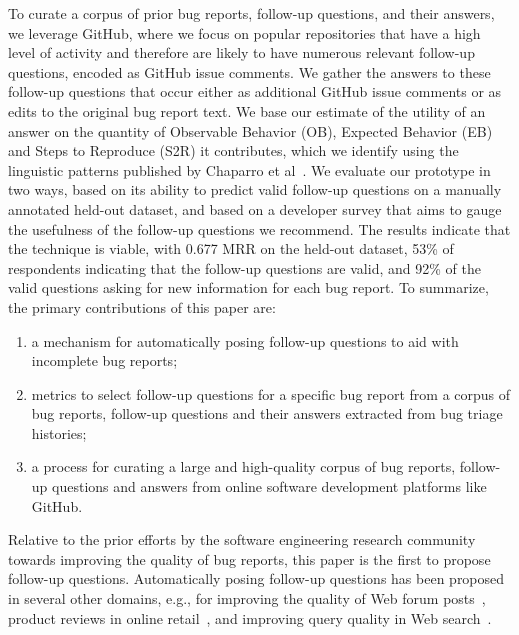 To curate a corpus of prior bug reports, follow-up questions, and their answers, we leverage GitHub, where we focus on popular repositories that have a high level of activity and therefore are likely to have numerous relevant follow-up questions, encoded as GitHub issue comments. We gather the answers to these follow-up questions that occur either as additional GitHub issue comments or as edits to the original bug report text. We base our estimate of the utility of an answer on the quantity of Observable Behavior (OB), Expected Behavior (EB) and Steps to Reproduce (S2R) it contributes, which we identify using the linguistic patterns published by Chaparro et al~\cite{chaparro17detecting}. We evaluate our prototype in two ways, based on its ability to predict valid follow-up questions on a manually annotated held-out dataset, and based on a developer survey that aims to gauge the usefulness of the follow-up questions we recommend. The results indicate that the technique is viable, with 0.677 MRR on the held-out dataset, 53\% of respondents indicating that the follow-up questions are valid, and 92\% of the valid questions asking for new information for each bug report. To summarize, the primary contributions of this paper are:

\begin{enumerate}
\item a mechanism for automatically posing follow-up questions to aid with incomplete bug reports;
\item metrics to select follow-up questions for a specific bug report from a corpus of bug reports, follow-up questions and their answers extracted from bug triage histories;
\item a process for curating a large and high-quality corpus of bug reports, follow-up questions and answers from online software development platforms like GitHub.
\end{enumerate}

Relative to the prior efforts by the software engineering research community towards improving the quality of bug reports, this paper is the first to propose follow-up questions. Automatically posing follow-up questions has been proposed in several other domains, e.g.,  for improving the quality of Web forum posts~\cite{rao-daume-iii-2018-learning}, product reviews in online retail~\cite{rao2019answer}, and improving query quality in Web search~\cite{10.1145/3366423.3380126}.

%
